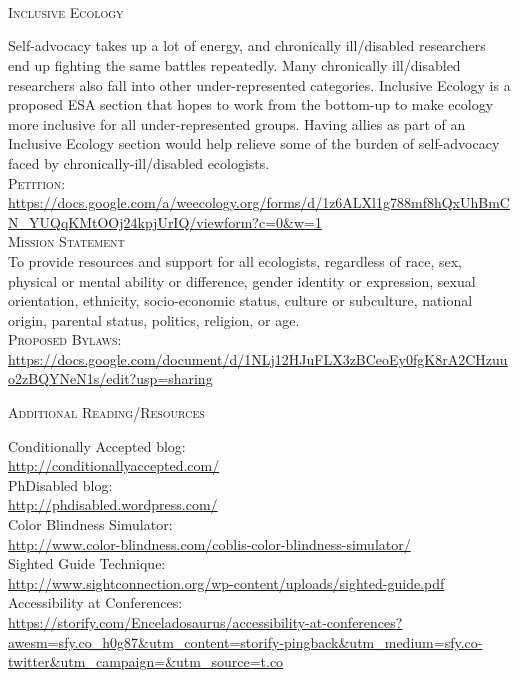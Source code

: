 \documentclass{beamer}
\begin{document}
\begin{center}
\begin{minipage}{0.42\linewidth}
\end{minipage}
\hspace{1cm}
\begin{minipage}{0.25\linewidth}
\vspace{0.5cm}
~\\
~\\
~\\
\begin{Large}
\textsc{Inclusive Ecology}\\
\end{Large}
Self-advocacy takes up a lot of energy, and chronically ill/disabled researchers end up fighting the same battles repeatedly.  Many chronically ill/disabled researchers also fall into other under-represented categories.  Inclusive Ecology is a proposed ESA section that hopes to work from the bottom-up to make ecology more inclusive for all under-represented groups.  Having allies as part of an Inclusive Ecology section would help relieve some of the burden of self-advocacy faced by chronically-ill/disabled ecologists.\\

\textsc{Petition:}
\url{https://docs.google.com/a/weecology.org/forms/d/1z6ALXl1g788mf8hQxUhBmCN_YUQqKMtOOj24kpjUrIQ/viewform?c=0&w=1}\\

\textsc{Mission Statement}\\
To provide resources and support for all ecologists, regardless of race, sex, physical or mental ability or difference, gender identity or expression, sexual orientation, ethnicity, socio-economic status, culture or subculture, national origin,  parental status, politics, religion, or age.\\

\textsc{Proposed Bylaws:}\\
\url{https://docs.google.com/document/d/1NLj12HJuFLX3zBCeoEy0fgK8rA2CHzuuo2zBQYNeN1s/edit?usp=sharing}\\

\begin{Large}
\textsc{Additional Reading/Resources}\\
\end{Large}
Conditionally Accepted blog:\\
\url{http://conditionallyaccepted.com/}\\
PhDisabled blog:\\
\url{http://phdisabled.wordpress.com/}\\
Color Blindness Simulator:\\
\url{http://www.color-blindness.com/coblis-color-blindness-simulator/}\\
Sighted Guide Technique:\\
\url{http://www.sightconnection.org/wp-content/uploads/sighted-guide.pdf}\\
Accessibility at Conferences:\\
\url{https://storify.com/Enceladosaurus/accessibility-at-conferences?awesm=sfy.co_h0g87&utm_content=storify-pingback&utm_medium=sfy.co-twitter&utm_campaign=&utm_source=t.co}\\
\end{minipage}
\end{center}
\end{document}
